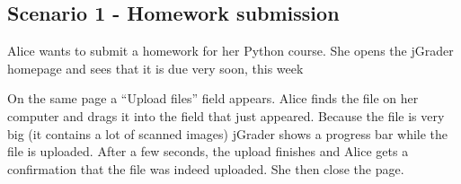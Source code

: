 \subsection{Scenario 1 - Homework submission}

Alice wants to submit a homework for her Python course.
She opens the jGrader homepage and sees that it is due very soon, this week

On the same page a ``Upload files'' field appears. Alice finds the file on her computer and drags it into the field that just appeared. Because the file is very big (it contains a lot of scanned images) jGrader shows a progress bar while the file is uploaded. After a few seconds, the upload finishes and Alice gets a confirmation that the file was indeed uploaded. She then close the page.
